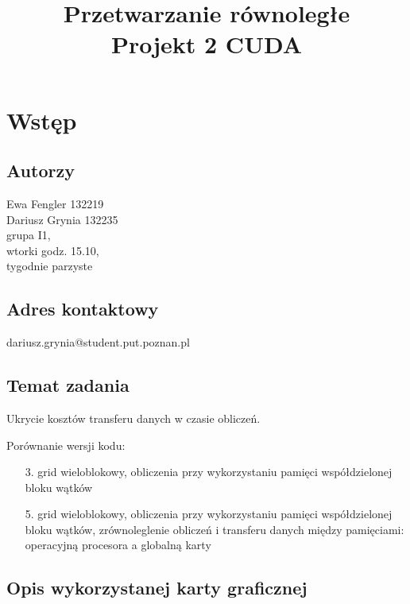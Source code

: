 \documentclass[12pt,a4paper]{article}
\date{}
\title{Przetwarzanie równoległe \\ \Large Projekt 2 CUDA}
\begin{document}
\maketitle
\thispagestyle{empty}

\vspace{-2cm} %
\section{Wstęp}

\subsection{Autorzy}
Ewa Fengler 132219\\
Dariusz Grynia 132235\\
grupa I1,\\
wtorki godz. 15.10,\\
tygodnie parzyste\\

\subsection{Adres kontaktowy}
dariusz.grynia@student.put.poznan.pl

\subsection{Temat zadania}
Ukrycie kosztów transferu danych w czasie obliczeń.

Porównanie wersji kodu:
\begin{itemize}
\item [3.] grid wieloblokowy, obliczenia przy wykorzystaniu pamięci współdzielonej bloku wątków
\item [5.] grid wieloblokowy, obliczenia przy wykorzystaniu pamięci współdzielonej bloku wątków, zrównoleglenie obliczeń i transferu danych między pamięciami: operacyjną procesora a globalną karty
\end{itemize}

\subsection{Opis wykorzystanej karty graficznej}
\end{document}

